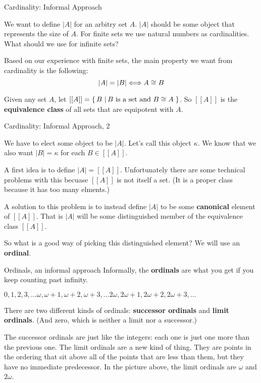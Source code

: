 \documentclass[pdf,final]{prosper}
\newcommand{\skipsmall}{\vspace{1em}}
\begin{document}
\begin{slide}{Cardinality: Informal Approach}

We want to define $|A|$ for an arbitry set $A$. $|A|$ should be some object that
represents the size of $A$. For finite sets we use natural numbers as
cardinalities. What should we use for infinite sets?

\skipsmall

Based on our experience with finite sets, the main property we want from
cardinality is the following:
\begin{equation}
|A|=|B| \Longleftrightarrow A\cong B
\end{equation}

\skipsmall

Given any set $A$, let $[[A]]=\left\{ \, B \, \left| \, B\text{ is a set and } B\cong A \, \right.\right\}$. So
$[[A]]$ is the \textbf{equivalence class} of all sets that are equipotent with
$A$. 

\end{slide}

\begin{slide}{Cardinality: Informal Approach, 2}

We have to elect some object to be $|A|$.  Let's call this object $\kappa$. We
know that we also want $|B|=\kappa$ for each $B\in[[A]]$.

\skipsmall

A first idea is to define $|A| = [[A]]$. Unfortunately there are some technical
problems with this becuase $[[A]]$  is not itself a set. (It is a proper class
because it has too many elments.)

\skipsmall
A solution to this problem is to instead define $|A|$ to be some
\textbf{canonical} element of $[[A]]$. That is $|A|$ will be some distinguished
member of the equivalence class $[[A]]$.

\skipsmall

So what is a good way of picking this distinguished element? We will use an \textbf{ordinal}.

\end{slide}

\begin{slide}{Ordinals, an informal approach}
Informally, the \textbf{ordinals} are what you get if you keep counting past
infinity. 

\skipsmall

$0,1,2,3,\dots\omega,\omega+1,\omega+2,\omega+3,\dots 2
\omega,2\omega+1,2\omega+2, 2\omega+3,\dots$


\skipsmall
There are two different kinds of ordinals: \textbf{successor ordinals} and
\textbf{limit ordinals}. (And zero, which is neither a limit nor a successor.)

\skipsmall

The successor ordinals are just like the integers: each one is just one more
than the previous one. The limit ordinals are a new kind of thing. They are
points in the ordering that sit above all of the points that are less than them,
but they have no immediate predecessor. In the picture above, the limit ordinals
are $\omega$ and $2\omega$.
\end{slide}
\end{document}
